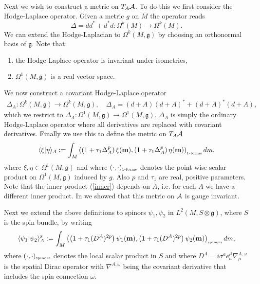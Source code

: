 \documentclass[letterpaper,11pt]{article}
\def\m{\mu}
\def\oo{\omega}
\def\OO{\Omega}
\def\ca{{\cal A}}
\begin{document}
Next we wish to construct a metric on $T_A\ca$. To do this we first consider the Hodge-Laplace operator. Given a metric $g$ on $M$ the operator reads 
$$
\Delta = d d^* + d^* d: \OO^k(M)\rightarrow \OO^k(M).
$$
We can extend the Hodge-Laplacian to $\OO^k(M,\mathfrak{g})$ by choosing an orthonormal basis of $\mathfrak{g}$. 
Note that: 
\begin{enumerate}
\item
the Hodge-Laplace operator is invariant under isometries,
\item
$\OO^1(M,\mathfrak{g})$ is a real vector space.
\end{enumerate}
We now  construct a covariant Hodge-Laplace operator 
\begin{eqnarray}
\Delta_{A} : \OO^k(M,\mathfrak{g})\rightarrow \OO^k(M,\mathfrak{g})
,\quad\Delta_{A} = (d+A) (d+A)^* + (d+A)^* (d+A),
\end{eqnarray}
which we restrict to $\Delta_{A}:\OO^1(M,\mathfrak{g})\rightarrow \OO^1(M,\mathfrak{g})$. $\Delta_A$ is simply the ordinary Hodge-Laplace operator where all derivatives are replaced with covariant derivatives. Finally we use this to define the metric on $T_A\ca$ 
\begin{equation}
\langle \xi \vert \eta \rangle_A := \int_M \left(  \left(  1 + \tau_1\Delta_{A}^p\right) \xi({\bf m})         , \left(  1 + \tau_1\Delta_{A}^p\right) \eta({\bf m})   \right)_{\mbox{\tiny 1-forms}}       dm,
\label{inner}
\end{equation}
where $\xi,\eta\in\OO^1(M,\mathfrak{g})$ and where $(\cdot,\cdot)_{\mbox{\tiny 1-forms}} $ denotes the point-wise scalar product on $\OO^1(M,\mathfrak{g})$ induced by $g$. Also $p$ and $\tau_1$ are real, positive parameters.
%
Note that the inner product (\ref{inner}) depends on $A$, i.e. for each $A$ we have a different inner product.
%
In \cite{Aastrup:2019yui} we showed that this metric on $\ca$ is gauge invariant.





Next we extend the above definitions to spinors $\psi_1,\psi_2$ in $L^2(M,S\otimes \mathfrak{g})$, where $S$ is the spin bundle, by writing  
\begin{equation}
\langle \psi_1 \vert \psi_2 \rangle_{A}^{\mbox{\tiny S}} := \int_M \left(  \left(  1 + \tau_1 (D^A) ^{2p}\right) \psi_1({\bf m})         , \left(  1 + \tau_1(D^A) ^{2p}\right) \psi_2({\bf m})   \right)_{\mbox{\tiny spinors}}        dm,
\label{innerspinor}
\end{equation}
where $(\cdot,\cdot)_{\mbox{\tiny spinors}} $ denotes the local scalar product in $S$ and where $D^A=i \sigma^a e^\m_a \nabla^{A,\oo}_\m$ is the spatial Dirac operator with $\nabla^{A,\oo}$ being the covariant derivative that includes the spin connection
$\oo$.
\end{document}
